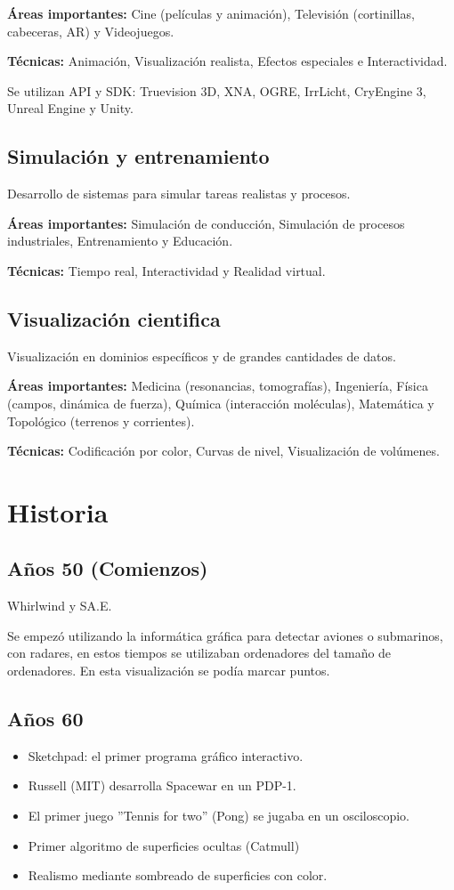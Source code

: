 \textbf{Áreas importantes:} Cine (películas y animación), Televisión (cortinillas, cabeceras, AR) y Videojuegos.

\textbf{Técnicas:} Animación, Visualización realista, Efectos especiales e Interactividad.

Se utilizan API y SDK: Truevision 3D, XNA, OGRE, IrrLicht, CryEngine 3, Unreal Engine y Unity.

\subsection{Simulación y entrenamiento}\label{subsec:simulación-y-entrenamiento}
Desarrollo de sistemas para simular tareas realistas y procesos.

\textbf{Áreas importantes:} Simulación de conducción, Simulación de procesos industriales, Entrenamiento y Educación.

\textbf{Técnicas:} Tiempo real, Interactividad y Realidad virtual.

\subsection{Visualización cientifica}\label{subsec:visualización-cientifica}
Visualización en dominios específicos y de grandes cantidades de datos.

\textbf{Áreas importantes:} Medicina (resonancias, tomografías), Ingeniería, Física (campos, dinámica de fuerza), Química (interacción moléculas), Matemática y Topológico (terrenos y corrientes).

\textbf{Técnicas:} Codificación por color, Curvas de nivel, Visualización de volúmenes.

\section{Historia}\label{sec:historia}
\subsection{Años 50 (Comienzos)}
Whirlwind y SA\@.E.

Se empezó utilizando la informática gráfica para detectar aviones o submarinos, con radares, en estos tiempos se utilizaban ordenadores del tamaño de ordenadores. En esta visualización se podía marcar puntos.

\subsection{Años 60}\label{subsec:años-60}
\begin{itemize}
	\item Sketchpad: el primer programa gráfico interactivo.
	\item Russell (MIT) desarrolla Spacewar en un PDP-1.
	\item El primer juego ''Tennis for two'' (Pong) se jugaba en un osciloscopio.
	\item Primer algoritmo de superficies ocultas (Catmull)
	\item Realismo mediante sombreado de superficies con color.
\end{itemize}

